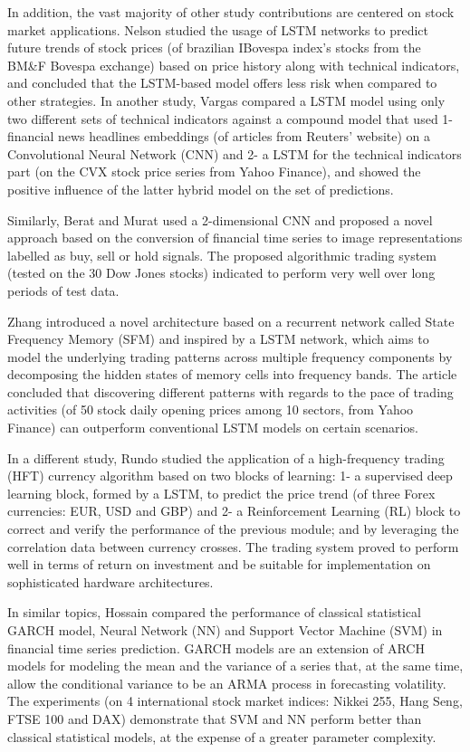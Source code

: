 \documentclass[10pt,twocolumn,letterpaper]{article}
\begin{document}
In addition, the vast majority of other study contributions are centered on stock market applications. Nelson \etal \cite{Nelson} studied the usage of LSTM networks to predict future trends of stock prices (of brazilian IBovespa index’s stocks from the BM\&F Bovespa exchange) based on price history along with technical indicators, and concluded that the LSTM-based model offers less risk when compared to other strategies. In another study, Vargas \etal \cite{Vargas} compared a LSTM model using only two different sets of technical indicators against a compound model that used 1- financial news headlines embeddings (of articles from Reuters’ website) on a Convolutional Neural Network (CNN) and 2- a LSTM for the technical indicators part (on the CVX stock price series from Yahoo Finance), and showed the positive influence of the latter hybrid model on the set of predictions.

Similarly, Berat and Murat \cite{Berat_Murat} used a 2-dimensional CNN and proposed a novel approach based on the conversion of financial time series to image representations labelled as buy, sell or hold signals. The proposed algorithmic trading system (tested on the 30 Dow Jones stocks) indicated to perform very well over long periods of test data.

Zhang \etal \cite{Zhang} introduced a novel architecture based on a recurrent network called State Frequency Memory (SFM) and inspired by a LSTM network, which aims to model the underlying trading patterns across multiple frequency components by decomposing the hidden states of memory cells into frequency bands. The article concluded that discovering different patterns with regards to the pace of trading activities (of 50 stock daily opening prices among 10 sectors, from Yahoo Finance) can outperform conventional LSTM models on certain scenarios.

In a different study, Rundo \cite{Rundo} studied the application of a high-frequency trading (HFT) currency algorithm based on two blocks of learning: 1- a supervised deep learning block, formed by a LSTM, to predict the price trend (of three Forex currencies: EUR, USD and GBP) and 2- a Reinforcement Learning (RL) block to correct and verify the performance of the previous module; and by leveraging the correlation data between currency crosses. The trading system proved to perform well in terms of return on investment and be suitable for implementation on sophisticated hardware architectures.

In similar topics, Hossain \etal \cite{Hossain} compared the performance of classical statistical GARCH model, Neural Network (NN) and Support Vector Machine (SVM) in financial time series prediction. GARCH models are an extension of ARCH models for modeling the mean and the variance of a series that, at the same time, allow the conditional variance to be an ARMA process in forecasting volatility. The experiments (on 4 international stock market indices: Nikkei 255, Hang Seng, FTSE 100 and DAX) demonstrate that SVM and NN perform better than classical statistical models, at the expense of a greater parameter complexity.
\end{document}
